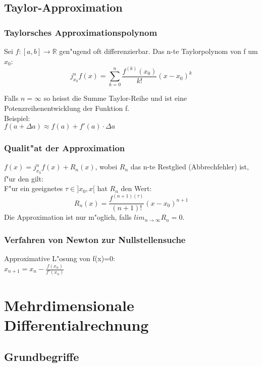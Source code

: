 \documentclass[10pt, a4paper, twocolumn]{scrartcl}
\begin{document}
\subsection{Taylor-Approximation}

\subsubsection{Taylorsches Approximationspolynom}

Sei $f:[a,b]\to{\mathbb{R}}$ gen"ugend oft differenzierbar. Das n-te Taylorpolynom von f um $x_0$:\\
\begin{displaymath}
j^{n}_{x_0}f(x)=\sum^{n}_{k=0}\frac{f^{(k)}(x_0)}{k!}(x-x_0)^k
\end{displaymath}

Falls $n=\infty$ so heisst die Summe Taylor-Reihe und ist eine Potenzreihenentwicklung der Funktion f.\\

Beispiel:\\
$f(a+\Delta a)\approx f(a)+f'(a)\cdotp\Delta a$

\subsubsection{Qualit"at der Approximation}

$f(x)=j^n_{x_0}f(x)+R_n(x)$, wobei $R_n$ das n-te Restglied (Abbrechfehler) ist, f"ur den gilt:\\
F"ur ein geeignetes $\tau\in ]x_0,x[$ hat $R_n$ den Wert:
\begin{displaymath}
 R_n(x)=\frac{f^{(n+1)(\tau)}}{(n+1)!}(x-x_0)^{n+1}
\end{displaymath}
Die Approximation ist nur m"oglich, falls $lim_{n\to\infty}R_n=0$.

\subsubsection{Verfahren von Newton zur Nullstellensuche}
Approximative L"osung von f(x)=0:\\
$x_{n+1}=x_n-\frac{f(x_n)}{f'(x_n)}$

\section{Mehrdimensionale Differentialrechnung}

\subsection{Grundbegriffe}
\end{document}
